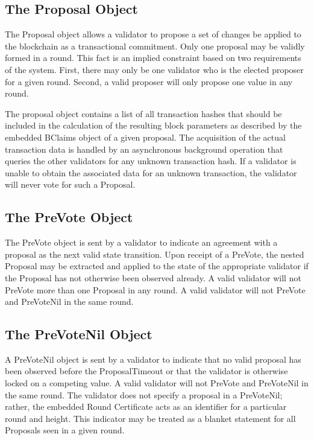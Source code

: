 \subsection{The Proposal Object}



The Proposal object allows a validator to propose a set of changes be
applied to the blockchain as a transactional commitment.
Only one proposal may be validly formed in a round.
This fact is an implied constraint based on two requirements of the
system.
First, there may only be one validator who is the elected proposer for
a given round.
Second, a valid proposer will only propose one value in any round.

The proposal object contains a list of all transaction hashes that
should be included in the calculation of the resulting block parameters
as described by the embedded BClaims object of a given proposal.
The acquisition of the actual transaction data is handled by an
asynchronous background operation that queries the other validators for
any unknown transaction hash.
If a validator is unable to obtain the associated data for an unknown
transaction, the validator will never vote for such a Proposal.


\subsection{The PreVote Object}



The PreVote object is sent by a validator to indicate an agreement with
a proposal as the next valid state transition.
Upon receipt of a PreVote, the nested Proposal may be extracted and
applied to the state of the appropriate validator if the Proposal has
not otherwise been observed already.
A valid validator will not PreVote more than one Proposal in any round.
A valid validator will not PreVote and PreVoteNil in the same round.

\subsection{The PreVoteNil Object}



A PreVoteNil object is sent by a validator to indicate that no valid
proposal has been observed before the ProposalTimeout or that the
validator is otherwise locked on a competing value.
A valid validator will not PreVote and PreVoteNil in the same round.
The validator does not specify a proposal in a PreVoteNil; rather, the
embedded Round Certificate acts as an identifier for a particular round
and height.
This indicator may be treated as a blanket statement for all Proposals
seen in a given round.

